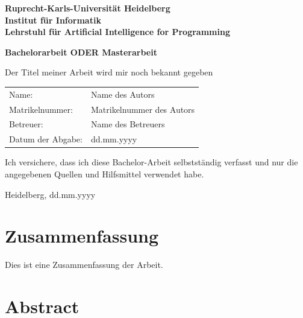 \documentclass[
     12pt,                    %
     a4paper,             %
     BCOR10mm,     %
     DIV14,                 %
     listof=totoc,                    %
     bibliography=totoc,       %
     index=totoc,              %
     twoside,
     headsepline
     ]{scrreprt}
\begin{document}
\begin{titlepage}


\vspace*{1cm}
\begin{center}
\vspace*{3cm}
\textbf{ 
\Large Ruprecht-Karls-Universität Heidelberg\\
\smallskip
\Large Institut für Informatik\\
\smallskip
\Large Lehrstuhl für Artificial Intelligence for Programming\\
\smallskip
}

\vspace{3cm}

\textbf{\large Bachelorarbeit ODER Masterarbeit} %

\vspace{0.5\baselineskip}
{\huge
Der Titel meiner Arbeit wird mir noch bekannt gegeben
}
\end{center}

\vfill 

{\large
\begin{tabular}[l]{ll}
Name: & Name des Autors\\
Matrikelnummer: & Matrikelnummer des Autors\\
Betreuer: & Name des Betreuers\\
Datum der Abgabe: & dd.mm.yyyy
\end{tabular}
}

\end{titlepage}

\onehalfspacing

\thispagestyle{empty}

\vspace*{100pt}
\noindent
Ich versichere, dass ich diese Bachelor-Arbeit selbstständig verfasst und nur die angegebenen
Quellen und Hilfsmittel verwendet habe.

\vspace*{50pt}

\noindent
Heidelberg, dd.mm.yyyy
\cleardoublepage

\section*{Zusammenfassung}

Dies ist eine Zusammenfassung der Arbeit.

\section*{Abstract}
\end{document}
